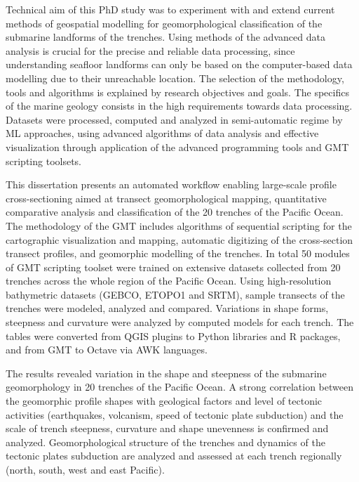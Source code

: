 \documentclass[11pt,a4paper]{report}
\begin{document}
Technical aim of this PhD study was to experiment with and extend current methods of geospatial modelling for geomorphological classification of the submarine landforms of the trenches. Using methods of the advanced data analysis is crucial for the precise and reliable data processing, since understanding seafloor landforms can only be based on the computer-based data modelling due to their unreachable location. The selection of the methodology, tools and algorithms is explained by research objectives and goals. The specifics of the marine geology consists in the high requirements towards data processing. Datasets were processed, computed and analyzed in semi-automatic regime by \ac{ML} approaches, using advanced algorithms of data analysis and effective visualization through application of the advanced programming tools and \ac{GMT} scripting toolsets. \par
This dissertation presents an automated workflow enabling large-scale profile cross-sectioning aimed at transect geomorphological mapping, quantitative comparative analysis and classification of the 20 trenches of the Pacific Ocean. The methodology of the \ac{GMT} includes algorithms of sequential scripting for the cartographic visualization and mapping, automatic digitizing of the cross-section transect profiles, and geomorphic modelling of the trenches. In total 50 modules of \ac{GMT} scripting toolset were trained on extensive datasets collected from 20 trenches across the whole region of the Pacific Ocean. Using high-resolution bathymetric datasets (\ac{GEBCO}, ETOPO1 and \ac{SRTM}), sample transects of the trenches were modeled, analyzed and compared. Variations in shape forms, steepness and curvature were analyzed by computed models for each trench. The tables were converted from QGIS plugins to Python libraries and R packages, and from \ac{GMT} to Octave via AWK languages. \par
The results revealed variation in the shape and steepness of the submarine geomorphology in 20 trenches of the Pacific Ocean. A strong correlation between the geomorphic profile shapes with geological factors and level of tectonic activities (earthquakes, volcanism, speed of tectonic plate subduction) and the scale of trench steepness, curvature and shape unevenness is confirmed and analyzed. Geomorphological structure of the trenches and dynamics of the tectonic plates subduction are analyzed and assessed at each trench regionally (north, south, west and east Pacific). \par
\end{document}
